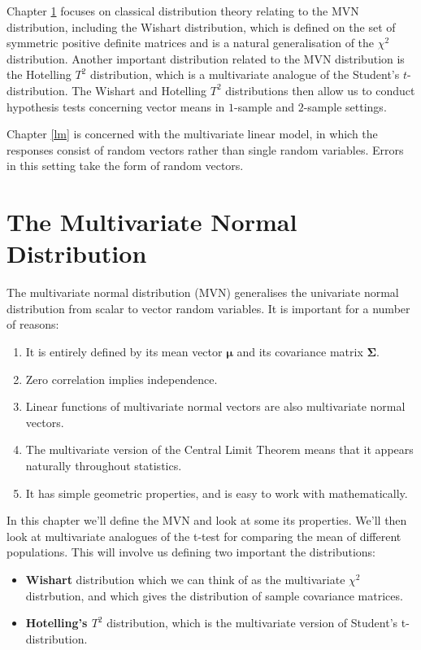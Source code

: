 \documentclass[
]{book}
\providecommand{\tightlist}{%
  \setlength{\itemsep}{0pt}\setlength{\parskip}{0pt}}
\theoremstyle{definition}
\theoremstyle{definition}
\theoremstyle{definition}
\theoremstyle{definition}
\theoremstyle{remark}
\begin{document}
Chapter \ref{multinormal} focuses on classical distribution theory relating to the MVN distribution, including the Wishart distribution, which is defined on the set of symmetric positive definite matrices and is a natural generalisation of the \(\chi^2\) distribution. Another important distribution related to the MVN distribution is the Hotelling \(T^2\) distribution, which is a multivariate analogue of the Student's \(t\)-distribution.
The Wishart and Hotelling \(T^2\) distributions then allow us to conduct hypothesis tests concerning vector means in \(1\)-sample and \(2\)-sample settings.

Chapter \ref{lm} is concerned with the multivariate linear model, in which the responses consist of random vectors rather than single random variables. Errors in this setting take the form of random vectors.

\chapter{The Multivariate Normal Distribution}\label{multinormal}

The multivariate normal distribution (MVN) generalises the univariate normal distribution from scalar to vector random variables. It is important for a number of reasons:

\begin{enumerate}
\def\labelenumi{\arabic{enumi}.}
\tightlist
\item
  It is entirely defined by its mean vector \({\boldsymbol{\mu}}\) and its covariance matrix \(\boldsymbol{\Sigma}\).
\item
  Zero correlation implies independence.
\item
  Linear functions of multivariate normal vectors are also multivariate normal vectors.
\item
  The multivariate version of the Central Limit Theorem means that it appears naturally throughout statistics.
\item
  It has simple geometric properties, and is easy to work with mathematically.
\end{enumerate}

In this chapter we'll define the MVN and look at some its properties. We'll then look at multivariate analogues of the t-test for comparing the mean of different populations. This will involve us defining two important the distributions:

\begin{itemize}
\item
  \textbf{Wishart} distribution which we can think of as the multivariate \(\chi^2\) distrbution, and which gives the distribution of sample covariance matrices.
\item
  \textbf{Hotelling's \(T^2\)} distribution, which is the multivariate version of Student's t-distribution.
\end{itemize}
\end{document}
